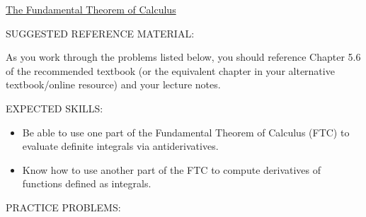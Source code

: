 \documentclass[12pt]{article}
\begin{document}
\begin{center}
\underline{\LARGE{The Fundamental Theorem of Calculus}}
\end{center}

\noindent SUGGESTED REFERENCE MATERIAL:

\bigskip

\noindent As you work through the problems listed below, you should reference Chapter 5.6 of the recommended textbook (or the equivalent chapter in your alternative textbook/online resource) and your lecture notes.

\bigskip

\noindent EXPECTED SKILLS:

\begin{itemize}

\item Be able to use one part of the Fundamental Theorem of Calculus (FTC) to evaluate definite integrals via antiderivatives. 

\item Know how to use another part of the FTC to compute derivatives of functions defined as integrals.

\end{itemize}

\noindent PRACTICE PROBLEMS:

\medskip
\end{document}
